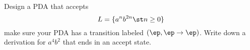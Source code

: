 Design a PDA that accepts
\[
L = \{a^n b^{2n} \st n \geq 0\}
\]
make sure your PDA has a transition labeled $(\ep, \ep\rightarrow\ep)$. 
Write down a derivation for $a^4 b^2$ that ends in an accept state.
